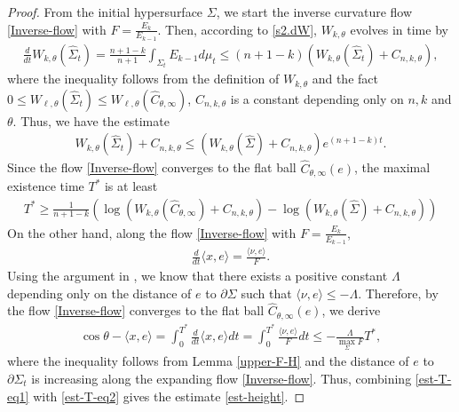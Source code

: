 \documentclass[11pt,reqno]{amsart}
\theoremstyle{definition}
\theoremstyle{remark}
\numberwithin{equation}{section}
\renewcommand{\(}{\left(}
\renewcommand{\)}{\right)}
\renewcommand{\-}{\overline}
\begin{document}
\begin{proof}
	From the initial hypersurface $\Sigma$, we start the inverse curvature flow \eqref{Inverse-flow} with $F=\frac{E_{k}}{E_{k-1}}$. Then,  according to \eqref{s2.dW}, $W_{k,\theta}$ evolves in time by
	\begin{align*}
	\frac{d}{dt}W_{k,\theta}(\widehat{\Sigma}_t)=\frac{n+1-k}{n+1}\int_{\Sigma_t}E_{k-1}d\mu_t\leq(n+1-k)(W_{k,\theta}(\widehat{\Sigma}_t)+C_{n,k,\theta}),
	\end{align*}
	where the inequality follows from the definition of $W_{k,\theta}$ and the fact $0\leq W_{\ell,\theta}(\widehat{\Sigma}_t)\leq W_{\ell,\theta}(\widehat{C}_{\theta,\infty})$, $C_{n,k,\theta}$ is a constant depending only on $n,k$ and $\theta$. Thus, we have the estimate
	\begin{align*}
		W_{k,\theta}(\widehat{\Sigma}_t)+C_{n,k,\theta}\leq (W_{k,\theta}(\widehat{\Sigma})+C_{n,k,\theta})e^{(n+1-k)t}.
	\end{align*}
	Since the flow \eqref{Inverse-flow} converges to the flat ball $\widehat{C}_{\theta,\infty}(e)$, the maximal existence time $T^*$ is at least
	\begin{align}\label{est-T-eq1}
		T^*\geq\frac{1}{n+1-k}\left(\log(	W_{k,\theta}(\widehat{C}_{\theta,\infty})+C_{n,k,\theta})-\log(	W_{k,\theta}(\widehat{\Sigma})+C_{n,k,\theta})\right)
	\end{align} 
	On the other hand, along the flow \eqref{Inverse-flow} with $F=\frac{E_{k}}{E_{k-1}}$,
	\begin{align*}
		\frac{d}{dt}\langle x,e\rangle=\frac{\langle\nu,e\rangle}{F}.
	\end{align*}
	Using the argument in \cite[Lemma 11]{Lambert-Scheuer2016}, we know that there exists a positive constant $\Lambda$ depending only on the distance of $e$ to $\partial\Sigma$ such that $\langle\nu,e\rangle\leq -\Lambda$. Therefore, by the flow \eqref{Inverse-flow} converges to the flat ball $\widehat{C}_{\theta,\infty}(e)$, we derive
	\begin{align}\label{est-T-eq2}
		\cos\theta-\langle x,e\rangle =\int_{0}^{T^*}\frac{d}{dt}\langle x,e\rangle dt=\int_{0}^{T^*}\frac{\langle\nu,e\rangle}{F}dt\leq-\frac{\Lambda}{\max_{\Sigma}F}T^*,
	\end{align}
	where the inequality follows from Lemma \ref{upper-F-H} and the distance of $e$ to $\partial\Sigma_t$ is increasing along the expanding flow \eqref{Inverse-flow}. Thus, combining \eqref{est-T-eq1} with \eqref{est-T-eq2} gives the estimate \eqref{est-height}.
\end{proof}
\end{document}
